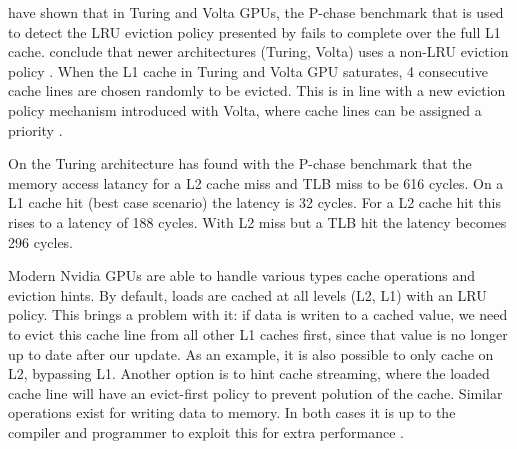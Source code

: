 \citet{jia2019dissecting} have shown that in Turing and Volta GPUs, the P-chase benchmark that is used to detect the LRU eviction policy presented by \citet{mei2016dissecting} fails to complete over the full L1 cache.
\citeauthor{jia2019dissecting} conclude that newer architectures (Turing, Volta) uses a non-LRU eviction policy \cite{jia2019dissecting, jia2018dissecting,mei2016dissecting}.
When the L1 cache in Turing and Volta GPU saturates, 4 consecutive cache lines are chosen randomly to be evicted.
This is in line with a new eviction policy mechanism introduced with Volta, where cache lines can be assigned a priority \cite{jia2019dissecting,nvidia2021cudadocs}.

On the Turing architecture \citeauthor{jia2019dissecting} has found with the P-chase benchmark that the memory access latancy for a L2 cache miss and TLB miss to be 616 cycles.
On a L1 cache hit (best case scenario) the latency is 32 cycles.
For a L2 cache hit this rises to a latency of 188 cycles.
With L2 miss but a TLB hit the latency becomes 296 cycles.

Modern Nvidia GPUs are able to handle various types cache operations and eviction hints.
By default, loads are cached at all levels (L2, L1) with an LRU policy.
This brings a problem with it: if data is writen to a cached value, we need to evict this cache line from all other L1 caches first, since that value is no longer up to date after our update.
As an example, it is also possible to only cache on L2, bypassing L1.
Another option is to hint cache streaming, where the loaded cache line will have an evict-first policy to prevent polution of the cache.
Similar operations exist for writing data to memory.
In both cases it is up to the compiler and programmer to exploit this for extra performance \cite{nvidia2021cudadocs}.


